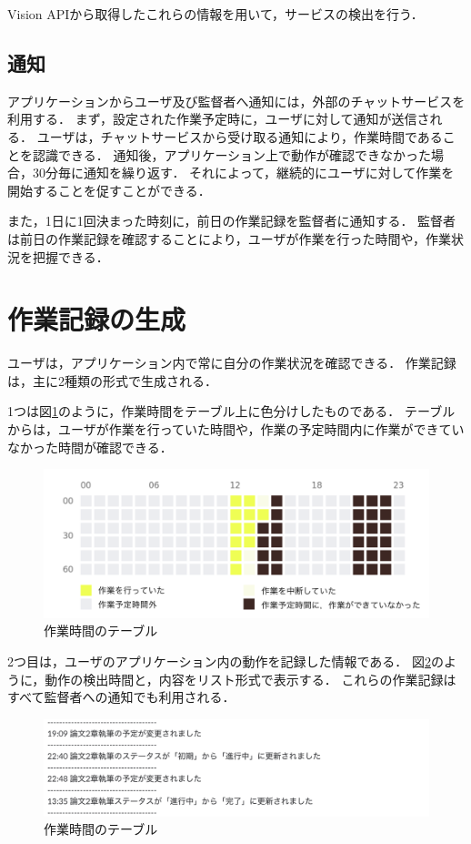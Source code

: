 Vision APIから取得したこれらの情報を用いて，サービスの検出を行う．

\subsection{通知}
アプリケーションからユーザ及び監督者へ通知には，外部のチャットサービスを利用する．
まず，設定された作業予定時に，ユーザに対して通知が送信される．
ユーザは，チャットサービスから受け取る通知により，作業時間であることを認識できる．
通知後，アプリケーション上で動作が確認できなかった場合，30分毎に通知を繰り返す．
それによって，継続的にユーザに対して作業を開始することを促すことができる．

また，1日に1回決まった時刻に，前日の作業記録を監督者に通知する．
監督者は前日の作業記録を確認することにより，ユーザが作業を行った時間や，作業状況を把握できる．

\clearpage

\section{作業記録の生成}
ユーザは，アプリケーション内で常に自分の作業状況を確認できる．
作業記録は，主に2種類の形式で生成される．

1つは図\ref{fig:activity_table}のように，作業時間をテーブル上に色分けしたものである．
テーブルからは，ユーザが作業を行っていた時間や，作業の予定時間内に作業ができていなかった時間が確認できる．

\begin{figure}[h]
  \begin{center}
  \includegraphics[width=12.0cm]{graphics/activity_table.png}
  \caption{作業時間のテーブル}
  \label{fig:activity_table}
  \end{center}
\end{figure}

\clearpage

2つ目は，ユーザのアプリケーション内の動作を記録した情報である．
図\ref{fig:activity_log}のように，動作の検出時間と，内容をリスト形式で表示する．
これらの作業記録はすべて監督者への通知でも利用される．

\begin{figure}[h]
  \begin{center}
  \includegraphics[width=14.0cm]{graphics/activity_log.png}
  \caption{作業時間のテーブル}
  \label{fig:activity_log}
  \end{center}
\end{figure}



